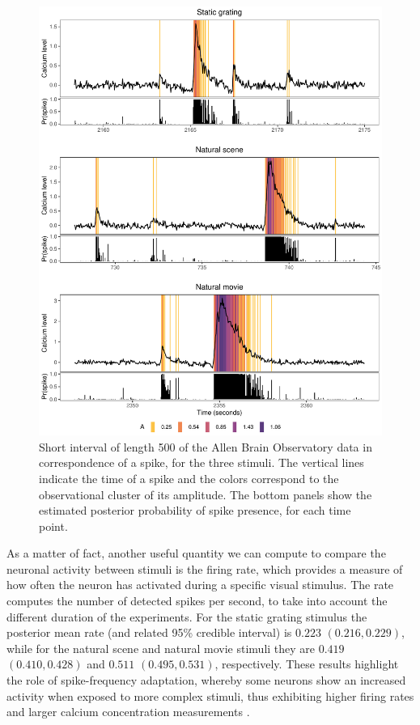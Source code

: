 \begin{figure}
	\centerline{\includegraphics[width = \textwidth]{_Images/ch3_spike_color_prob_new.pdf}}
	\caption[Visual representation of the estimated spikes and their amplitudes in the calcium trace from the Allen Brain Observatory data.]{Short interval of length 500 of the Allen Brain Observatory data in correspondence of a spike, for the three stimuli. The vertical lines indicate the time of a spike and the colors correspond to the observational cluster of its amplitude. The bottom panels show the estimated posterior probability of spike presence, for each time point.}
	\label{fig:spike_color}
\end{figure}

\clearpage



As a matter of fact, another useful quantity we can compute to compare the neuronal activity between stimuli is the firing rate, which provides a measure of how often the neuron has activated during a specific visual stimulus.
The rate computes the number of detected spikes per second, to take into account the different duration of the experiments.  For the static grating stimulus the posterior mean rate (and related 95\% credible interval) is $0.223$ $(0.216, 0.229)$, while for the natural scene and natural movie stimuli they are $0.419$ $(0.410, 0.428)$ and $0.511$ $(0.495, 0.531)$, respectively. These results highlight the role of spike-frequency adaptation, whereby some neurons show an increased activity when exposed to more complex stimuli, thus exhibiting higher firing rates and larger calcium concentration measurements \parencite{Peron2009}.



